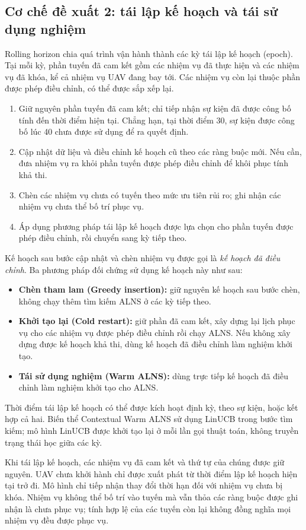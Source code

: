 \documentclass[11pt,a4paper]{article}
\begin{document}
\subsection{Cơ chế đề xuất 2: tái lập kế hoạch và tái sử dụng nghiệm}
Rolling horizon chia quá trình vận hành thành các kỳ tái lập kế hoạch (epoch). Tại mỗi kỳ, phần tuyến đã cam kết gồm các nhiệm vụ đã thực hiện và các nhiệm vụ đã khóa, kể cả nhiệm vụ UAV đang bay tới. Các nhiệm vụ còn lại thuộc phần được phép điều chỉnh, có thể được sắp xếp lại.
\begin{enumerate}
\item Giữ nguyên phần tuyến đã cam kết; chỉ tiếp nhận sự kiện đã được công bố tính đến thời điểm hiện tại. Chẳng hạn, tại thời điểm 30, sự kiện được công bố lúc 40 chưa được sử dụng để ra quyết định.
\item Cập nhật dữ liệu và điều chỉnh kế hoạch cũ theo các ràng buộc mới. Nếu cần, đưa nhiệm vụ ra khỏi phần tuyến được phép điều chỉnh để khôi phục tính khả thi.
\item Chèn các nhiệm vụ chưa có tuyến theo mức ưu tiên rủi ro; ghi nhận các nhiệm vụ chưa thể bố trí phục vụ.
\item Áp dụng phương pháp tái lập kế hoạch được lựa chọn cho phần tuyến được phép điều chỉnh, rồi chuyển sang kỳ tiếp theo.
\end{enumerate}
Kế hoạch sau bước cập nhật và chèn nhiệm vụ được gọi là \emph{kế hoạch đã điều chỉnh}. Ba phương pháp đối chứng sử dụng kế hoạch này như sau:
\begin{itemize}
\item \textbf{Chèn tham lam (Greedy insertion):} giữ nguyên kế hoạch sau bước chèn, không chạy thêm tìm kiếm ALNS ở các kỳ tiếp theo.
\item \textbf{Khởi tạo lại (Cold restart):} giữ phần đã cam kết, xây dựng lại lịch phục vụ cho các nhiệm vụ được phép điều chỉnh rồi chạy ALNS. Nếu không xây dựng được kế hoạch khả thi, dùng kế hoạch đã điều chỉnh làm nghiệm khởi tạo.
\item \textbf{Tái sử dụng nghiệm (Warm ALNS):} dùng trực tiếp kế hoạch đã điều chỉnh làm nghiệm khởi tạo cho ALNS.
\end{itemize}
Thời điểm tái lập kế hoạch có thể được kích hoạt định kỳ, theo sự kiện, hoặc kết hợp cả hai. Biến thể Contextual Warm ALNS sử dụng LinUCB trong bước tìm kiếm; mô hình LinUCB được khởi tạo lại ở mỗi lần gọi thuật toán, không truyền trạng thái học giữa các kỳ.

Khi tái lập kế hoạch, các nhiệm vụ đã cam kết và thứ tự của chúng được giữ nguyên. UAV chưa khởi hành chỉ được xuất phát từ thời điểm lập kế hoạch hiện tại trở đi. Mô hình chỉ tiếp nhận thay đổi thời hạn đối với nhiệm vụ chưa bị khóa. Nhiệm vụ không thể bố trí vào tuyến mà vẫn thỏa các ràng buộc được ghi nhận là chưa phục vụ; tính hợp lệ của các tuyến còn lại không đồng nghĩa mọi nhiệm vụ đều được phục vụ.
\end{document}
